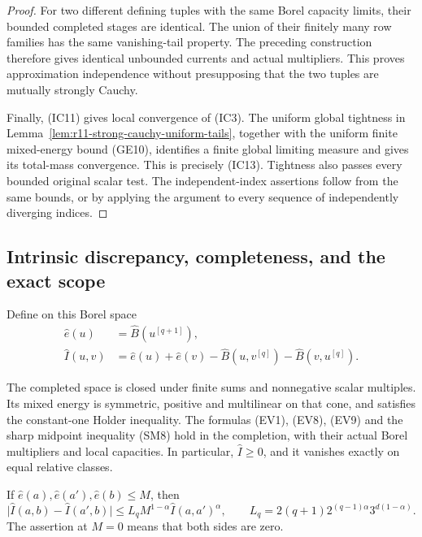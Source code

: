 \begin{proof}
For two different defining tuples with the same Borel
capacity limits, their bounded completed stages are identical.
The union of their finitely many row families has the same
vanishing-tail property. The preceding construction therefore
gives identical unbounded currents and actual multipliers.
This proves approximation independence without presupposing
that the two tuples are mutually strongly Cauchy.

Finally, (IC11) gives local convergence of (IC3).
The uniform global tightness in
Lemma~\ref{lem:r11-strong-cauchy-uniform-tails}, together
with the uniform finite mixed-energy bound (GE10), identifies
a finite global limiting measure and gives its total-mass
convergence. This is precisely (IC13). Tightness also passes
every bounded original scalar test. The independent-index
assertions follow from the same bounds, or by applying the
argument to every sequence of independently diverging indices.
\end{proof}

\subsection{Intrinsic discrepancy, completeness, and the exact scope}

Define on this Borel space
\[
 \begin{split}
 \widehat e(u)&=\widehat B(u^{[q+1]}),\\
 \widehat I(u,v)&=\widehat e(u)+\widehat e(v)
       -\widehat B(u,v^{[q]})-\widehat B(v,u^{[q]}).
 \end{split}
 \tag{IC17}
\]

\begin{lemma}
\label{lem:r11-discrepancy-uniform-perturbation}
The completed space is closed under finite sums and nonnegative
scalar multiples. Its mixed energy is symmetric, positive and
multilinear on that cone, and satisfies the constant-one Holder
inequality. The formulas (EV1), (EV8), (EV9) and the sharp
midpoint inequality (SM8) hold in the completion, with their
actual Borel multipliers and local capacities. In particular,
$\widehat I\geq0$, and it vanishes exactly on equal relative
classes.

If $\widehat e(a),\widehat e(a'),\widehat e(b)\leq M$,
then
\[
 \big|\widehat I(a,b)-\widehat I(a',b)\big|
       \leq L_q M^{1-\alpha}\widehat I(a,a')^\alpha,
 \qquad
 L_q=2(q+1)2^{(q-1)\alpha}3^{d(1-\alpha)}.
 \tag{IC18}
\]
The assertion at $M=0$ means that both sides are zero.
\end{lemma}

